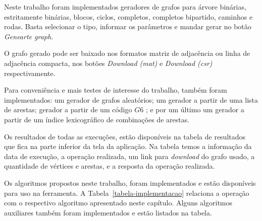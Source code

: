 

Neste trabalho foram implementados geradores de grafos para árvore binárias, estritamente binárias, blocos, ciclos, completos,
completos bipartido, caminhos e rodas. Basta selecionar o tipo, informar os parâmetros e mandar gerar no botão \textit{Genearte graph}.

O grafo gerado pode ser baixado nos formatos matriz de adjacência ou linha de adjacência compacta, nos botões \textit{Download (mat)} e \textit{Download (csr)} respectivamente.

Para conveniência e mais testes de interesse do trabalho, 
também foram implementados: um gerador de grafos aleatórios; um gerador a partir de uma lista de arestas; gerador a partir de um código $G6$ \cite{Brendan2015}; e por um último um gerador a partir de um índice lexicográfico de combinações de arestas.

Os resultados de todas as execuções, estão disponíveis na tabela de resultados que fica na parte inferior da tela da aplicação. 
Na tabela temos a informação da data de execução,
a operação realizada, um link para \textit{download} do grafo usado,
a quantidade de vértices e arestas, e a resposta da operação realizada.

Os algoritmos propostos neste trabalho, foram implementados e estão disponíveis para uso na ferramenta. A Tabela~\ref{tabela-implementacao} relaciona a operação com o respectivo algoritmo apresentado neste capítulo. Alguns algoritmos auxiliares também foram implementados e estão listados na tabela.


